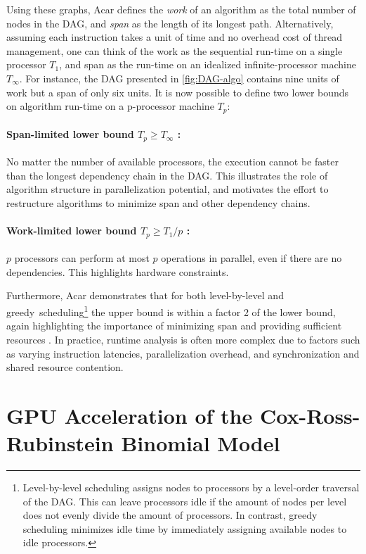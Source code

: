 \documentclass[english,12pt,a4paper,pdftex,sci,utf8]{aaltothesis}
\begin{document}
Using these graphs, Acar \cite{acar2016parallel} defines the \emph{work} of an algorithm as the total number of nodes in the DAG, and \emph{span} as the length of its longest path. Alternatively, assuming each instruction takes a unit of time and no overhead cost of thread management, one can think of the work as the sequential run-time on a single processor $T_1$, and span as the run-time on an idealized infinite-processor machine $T_{\infty}$. For instance, the DAG presented in \cref{fig:DAG-algo} contains nine units of work but a span of only six units. It is now possible to define two lower bounds on algorithm run-time on a p-processor machine $T_p$:

\paragraph{Span-limited lower bound $T_p \geq T_\infty$ :} No matter the number of available processors, the execution cannot be faster than the longest dependency chain in the DAG. This illustrates the role of algorithm structure in parallelization potential, and motivates the effort to restructure algorithms to minimize span and other dependency chains.

\paragraph{Work-limited lower bound $T_p \geq T_1/p$ :} $p$ processors can perform at most $p$ operations in parallel, even if there are no dependencies. This highlights hardware constraints.

Furthermore, Acar demonstrates that for both level-by-level and \mbox{greedy scheduling}\footnote{Level-by-level scheduling assigns nodes to processors by a level-order traversal of the DAG. This can leave processors idle if the amount of nodes per level does not evenly divide the amount of processors. In contrast, greedy scheduling minimizes idle time by immediately assigning available nodes to idle processors.} the upper bound is within a factor 2 of the lower bound, again highlighting the importance of minimizing span and providing sufficient resources \cite{acar2016parallel}. In practice, runtime analysis is often more complex due to factors such as varying instruction latencies, parallelization overhead, and synchronization and shared resource contention.
\clearpage

\section{GPU Acceleration of the Cox-Ross-Rubinstein Binomial Model} \label{sec:gpu-crr}
\end{document}
